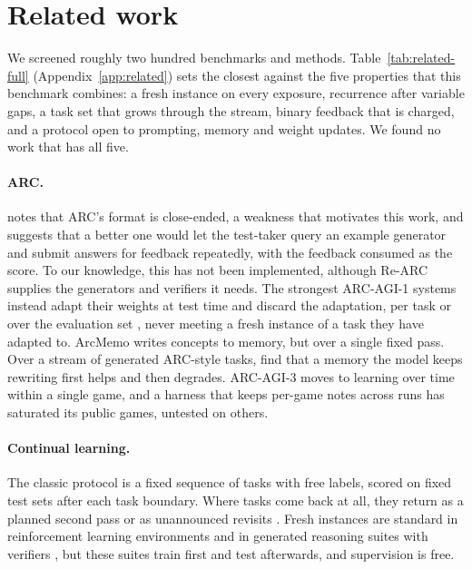 \section{Related work}
\label{sec:related}

We screened roughly two hundred benchmarks and methods. Table~\ref{tab:related-full} (Appendix~\ref{app:related}) sets the closest against the five properties that this benchmark combines: a fresh instance on every exposure, recurrence after variable gaps, a task set that grows through the stream, binary feedback that is charged, and a protocol open to prompting, memory and weight updates. We found no work that has all five.

\paragraph{ARC.}
\citet{chollet2019measure} notes that ARC's format is close-ended, a weakness that motivates this work, and suggests that a better one would let the test-taker query an example generator and submit answers for feedback repeatedly, with the feedback consumed as the score. To our knowledge, this has not been implemented, although Re-ARC \citep{hodel2024rearc} supplies the generators and verifiers it needs. The strongest ARC-AGI-1 systems instead adapt their weights at test time and discard the adaptation, per task \citep{akyurek2024ttt,franzen2025poe} or over the evaluation set \citep{pourcel2025soar}, never meeting a fresh instance of a task they have adapted to. ArcMemo \citep{ho2025arcmemo} writes concepts to memory, but over a single fixed pass. Over a stream of generated ARC-style tasks, \citet{zhang2026faulty} find that a memory the model keeps rewriting first helps and then degrades. ARC-AGI-3 \citep{arcprize2026arcagi3} moves to learning over time within a single game, and a harness that keeps per-game notes across runs \citep{bedi2026learningmachines} has saturated its public games, untested on others.

\paragraph{Continual learning.}
The classic protocol \citep{lopezpaz2017gradient,vandeven2019three} is a fixed sequence of tasks with free labels, scored on fixed test sets after each task boundary. Where tasks come back at all, they return as a planned second pass \citep{wolczyk2021continual,powers2022cora,veniat2021efficient} or as unannounced revisits \citep{caccia2020online,hemati2023class}. Fresh instances are standard in reinforcement learning environments \citep{cobbe2020procgen,kuttler2020nethack} and in generated reasoning suites with verifiers \citep{stojanovski2025reasoninggym,chen2025enigmata,zeng2026rlve}, but these suites train first and test afterwards, and supervision is free.

